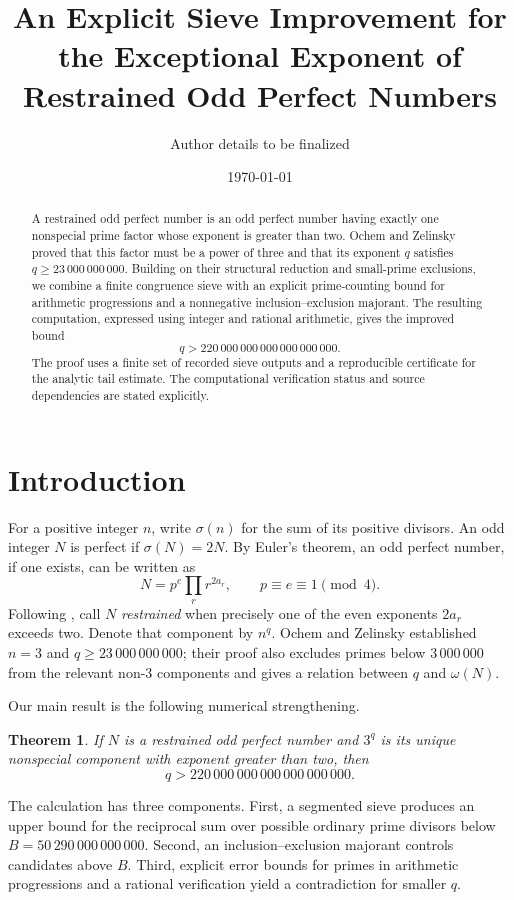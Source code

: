 \documentclass[11pt]{article}
\title{An Explicit Sieve Improvement for the Exceptional Exponent of Restrained Odd Perfect Numbers}
\author{Author details to be finalized}
\date{\today}
\newtheorem{theorem}{Theorem}
\begin{document}
\maketitle

\begin{abstract}
A restrained odd perfect number is an odd perfect number having exactly one nonspecial prime factor whose exponent is greater than two. Ochem and Zelinsky proved that this factor must be a power of three and that its exponent \(q\) satisfies \(q\ge 23\,000\,000\,000\).
Building on their structural reduction and small-prime exclusions, we combine a finite congruence sieve with an explicit prime-counting bound for arithmetic progressions and a nonnegative inclusion--exclusion majorant. The resulting computation, expressed using integer and rational arithmetic, gives the improved bound
\[
q>220\,000\,000\,000\,000\,000\,000.
\]
The proof uses a finite set of recorded sieve outputs and a reproducible certificate for the analytic tail estimate. The computational verification status and source dependencies are stated explicitly.
\end{abstract}

\section{Introduction}

For a positive integer \(n\), write \(\sigma(n)\) for the sum of its positive divisors. An odd integer \(N\) is perfect if \(\sigma(N)=2N\). By Euler's theorem, an odd perfect number, if one exists, can be written as
\[
N=p^e\prod_{r}r^{2a_r},\qquad p\equiv e\equiv1\pmod4.
\]
Following \cite{ochem-zelinsky}, call \(N\) \emph{restrained} when precisely one of the even exponents \(2a_r\) exceeds two. Denote that component by \(n^q\).
Ochem and Zelinsky established \(n=3\) and \(q\ge 23\,000\,000\,000\); their proof also excludes primes below \(3\,000\,000\) from the relevant non-\(3\) components and gives a relation between \(q\) and \(\omega(N)\).

Our main result is the following numerical strengthening.

\begin{theorem}\label{thm:main}
If \(N\) is a restrained odd perfect number and \(3^q\) is its unique nonspecial component with exponent greater than two, then
\[
q>220\,000\,000\,000\,000\,000\,000.
\]
\end{theorem}

The calculation has three components. First, a segmented sieve produces an upper bound for the reciprocal sum over possible ordinary prime divisors below \(B=50\,290\,000\,000\,000\). Second, an inclusion--exclusion majorant controls candidates above \(B\). Third, explicit error bounds for primes in arithmetic progressions \cite{bennett-et-al} and a rational verification yield a contradiction for smaller \(q\).
\end{document}
